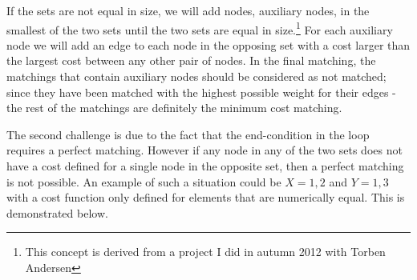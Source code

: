 \documentclass[11pt]{article}
\begin{document}
If the sets are not equal in size, we will add nodes, auxiliary nodes, in the smallest of the two sets until the two sets are equal in size.\footnote{This concept is derived from a project I did in autumn 2012 with Torben Andersen} For each auxiliary node we will add an edge to each node in the opposing set with a cost larger than the largest cost between any other pair of nodes. In the final matching, the matchings that contain auxiliary nodes should be considered as not matched; since they have been matched with the highest possible weight for their edges - the rest of the matchings are definitely the minimum cost matching.

The second challenge is due to the fact that the end-condition in the loop requires a perfect matching. However if any node in any of the two sets does not have a cost defined for a single node in the opposite set, then a perfect matching is not possible. An example of such a situation could be $X={1, 2}$ and $Y={1, 3}$ with a cost function only defined for elements that are numerically equal. This is demonstrated below. \\
\end{document}
